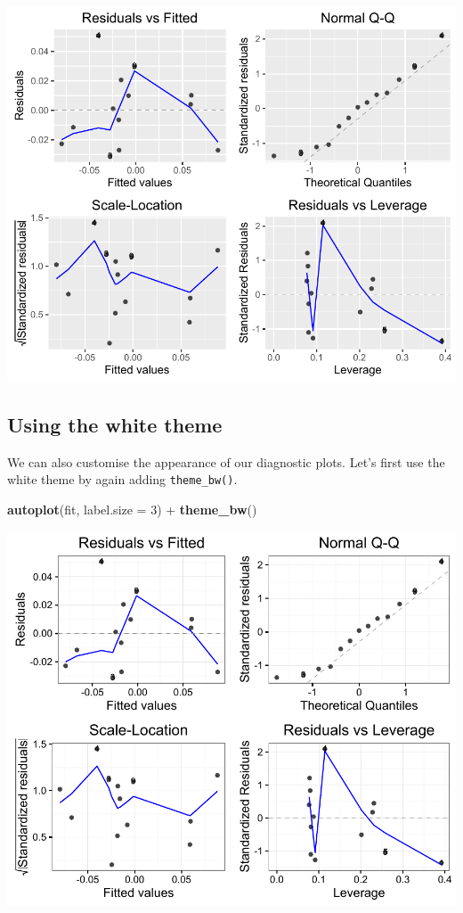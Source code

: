 \documentclass[]{article}
\newenvironment{Shaded}{\begin{snugshade}}{\end{snugshade}}
\newcommand{\KeywordTok}[1]{\textcolor[rgb]{0.13,0.29,0.53}{\textbf{{#1}}}}
\newcommand{\DataTypeTok}[1]{\textcolor[rgb]{0.13,0.29,0.53}{{#1}}}
\newcommand{\DecValTok}[1]{\textcolor[rgb]{0.00,0.00,0.81}{{#1}}}
\newcommand{\StringTok}[1]{\textcolor[rgb]{0.31,0.60,0.02}{{#1}}}
\newcommand{\NormalTok}[1]{{#1}}
\begin{document}
\begin{center}\includegraphics{11_Linear_Regression_Plot_pdf/lr_19-1} \end{center}

\subsection{Using the white theme}\label{using-the-white-theme-1}

We can also customise the appearance of our diagnostic plots. Let's
first use the white theme by again adding \texttt{theme\_bw()}.

\begin{Shaded}
\begin{Highlighting}[]
\KeywordTok{autoplot}\NormalTok{(fit, }\DataTypeTok{label.size =} \DecValTok{3}\NormalTok{) +}\StringTok{ }\KeywordTok{theme_bw}\NormalTok{()}
\end{Highlighting}
\end{Shaded}

\begin{center}\includegraphics{11_Linear_Regression_Plot_pdf/lr_20-1} \end{center}
\end{document}
